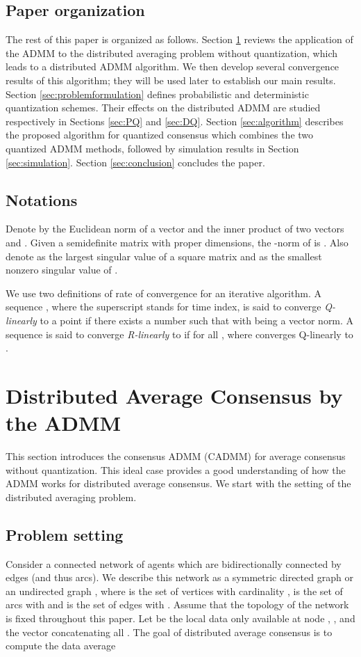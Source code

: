 \documentclass[journal]{IEEEtran}
\begin{document}
\subsection{Paper organization}
The rest of this paper is organized as follows. Section \ref{sec:ADMMnoQ} reviews the application of the ADMM to the distributed averaging problem without quantization, which leads to a distributed ADMM algorithm. We then develop several convergence results of this algorithm; they will be used later to establish our main results. Section \ref{sec:problemformulation} defines probabilistic and deterministic quantization schemes. Their effects on the distributed ADMM are studied respectively in Sections \ref{sec:PQ} and \ref{sec:DQ}. Section \ref{sec:algorithm} describes the proposed algorithm for quantized consensus which combines the two quantized ADMM methods, followed by simulation results in Section \ref{sec:simulation}. Section \ref{sec:conclusion} concludes the paper. 
\subsection{Notations}
Denote by  the Euclidean norm of a vector  and  the inner product of two vectors  and . Given a semidefinite matrix  with proper dimensions, the -norm of  is . Also denote  as the largest singular value of a square matrix  and  as the smallest nonzero singular value of . 

We use two definitions of rate of convergence for an iterative algorithm. A sequence , where the superscript  stands for time index, is said to converge \emph{Q-linearly} to a point  if there exists a number  such that  with  being a vector norm. A sequence  is said to converge \emph{R-linearly} to  if for all ,  where  converges Q-linearly to .

\section{Distributed Average Consensus by the ADMM}
\label{sec:ADMMnoQ}
This section introduces the consensus ADMM (CADMM) for average consensus without quantization. This ideal case provides a good understanding of how the ADMM works for distributed average consensus. We start with the setting of the distributed averaging problem.

\subsection{Problem setting}
\label{sec:orgnotation}
Consider a connected network of  agents which are bidirectionally connected by  edges (and thus  arcs). We describe this network as a symmetric directed graph  or an undirected graph , where  is the set of vertices with cardinality ,  is the set of arcs with  and  is the set of edges with . Assume that the topology of the network is fixed throughout this paper. Let  be the local data only available at node , , and  the vector concatenating all . The goal of distributed average consensus is to compute the data average  
 
\end{document}
